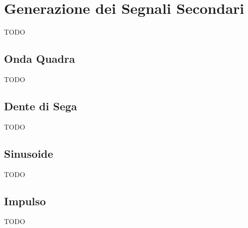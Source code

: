 \chapter{Generazione dei Segnali Secondari}

TODO


\section{Onda Quadra}

TODO


\section{Dente di Sega}

TODO


\section{Sinusoide}

TODO


\section{Impulso}

TODO